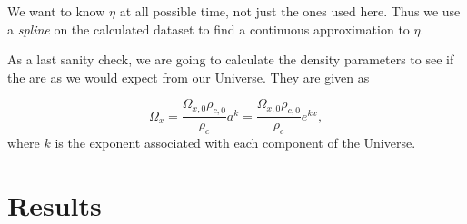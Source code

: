 \documentclass[a4paper,norsk, 10pt]{article}
\begin{document}
We want to know $\eta$ at all possible time, not just the ones used here. Thus we use a \textit{spline} on the calculated dataset to find a continuous approximation to $\eta$.


As a last sanity check, we are going to calculate the density parameters to see if the are as we would expect from our Universe. They are given as

\begin{equation}
\Omega_{x} = \frac{\Omega_{x,0}\rho_{c,0}}{\rho_{c}} a^{k} = \frac{\Omega_{x,0}\rho_{c,0}}{\rho_{c}} e^{kx},
\end{equation}
where $k$ is the exponent associated with each component of the Universe.


\newpage

\section{Results}
\end{document}
